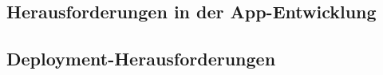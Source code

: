 \subsection{Herausforderungen in der App-Entwicklung}
	\label{ssec:llentwicklung}
	
\subsection{Deployment-Herausforderungen}
	\label{ssec:lldeployment}
